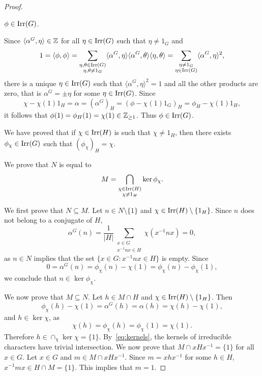\begin{proof}
  \begin{claim}
  $\phi\in\operatorname{Irr}(G)$.
  \end{claim}
  
  Since $\langle\alpha^G,\eta\rangle\in\mathbb{Z}$ for all $\eta\in\operatorname{Irr}(G)$ such that 
  $\eta\ne 1_G$ and 
  \[
  1=\langle\phi,\phi\rangle
  =\sum_{\substack{\eta,\theta\in\operatorname{Irr}(G)\\\eta,\theta\ne1_G}}\langle\alpha^G,\eta\rangle\langle\alpha^G,\theta\rangle\langle\eta,\theta\rangle
  =\sum_{\substack{\eta\ne 1_G\\\eta\in\operatorname{Irr}(G)}}\langle\alpha^G,\eta\rangle^2,
  \]
  there is a unique $\eta\in\operatorname{Irr}(G)$ such that 
  $\langle\alpha^G,\eta\rangle^2=1$ and all the other products are zero, 
  that is 
  $\alpha^G=\pm\eta$ for some $\eta\in\operatorname{Irr}(G)$. Since 
  \[
  \chi-\chi(1)1_H=\alpha=(\alpha^G)_H=(\phi-\chi(1)1_G)_H=\phi_H-\chi(1)1_H,
  \]
  it follows that $\phi(1)=\phi_H(1)=\chi(1)\in\mathbb{Z}_{\geq1}$. Thus $\phi\in\operatorname{Irr}(G)$. 

  \medskip
  We have proved that if $\chi\in\operatorname{Irr}(H)$ is such that $\chi\ne 1_H$, then 
  there exists $\phi_\chi\in\operatorname{Irr}(G)$ such that $(\phi_\chi)_H=\chi$. 
  
  \medskip
  We prove that $N$ is equal to 
  \[
	M=\bigcap_{\substack{\chi\in\operatorname{Irr}(H)\\\chi\ne1_H}}\ker\phi_{\chi}.
  \]

  We first prove that $N\subseteq M$. 
  Let $n\in N\setminus\{1\}$ and $\chi\in\operatorname{Irr}(H)\setminus\{1_H\}$. Since $n$ 
  does not belong to a conjugate of 
  $H$, 
  \[
	\alpha^G(n)=\frac{1}{|H|}\sum_{\substack{x\in G\\x^{-1}nx\in H}}\chi(x^{-1}nx)=0, 
  \]
  as $n\in N$ implies that the set $\{x\in G:x^{-1}nx\in H\}$ is empty. Since 
  \[
  0=\alpha^G(n)
  =\phi_{\chi}(n)-\chi(1)=\phi_{\chi}(n)-\phi_{\chi}(1),
  \]
  we conclude that $n\in\ker\phi_{\chi}$. 
  
  We now prove that $M\subseteq N$. 
  Let $h\in M\cap H$ and $\chi\in\operatorname{Irr}(H)\setminus\{1_H\}$. Then 
  \[
    \phi_{\chi}(h)-\chi(1)=\alpha^G(h)=\alpha(h)=\chi(h)-\chi(1),
  \]
  and $h\in\ker\chi$, as
  \[
    \chi(h)=\phi_{\chi}(h)=\phi_{\chi}(1)=\chi(1).
  \]
  Therefore $h\in\cap_{\chi}\ker\chi=\{1\}$. By~\eqref{eq:kernels}, the kernels
  of irreducible characters have trivial intersection. 
  We now prove that $M\cap
  xHx^{-1}=\{1\}$ for all $x\in G$. Let $x\in G$ and $m\in M\cap xHx^{-1}$. Since 
  $m=xhx^{-1}$ for some $h\in H$, $x^{-1}mx\in H\cap M=\{1\}$.  This implies that 
  $m=1$.
\end{proof}

